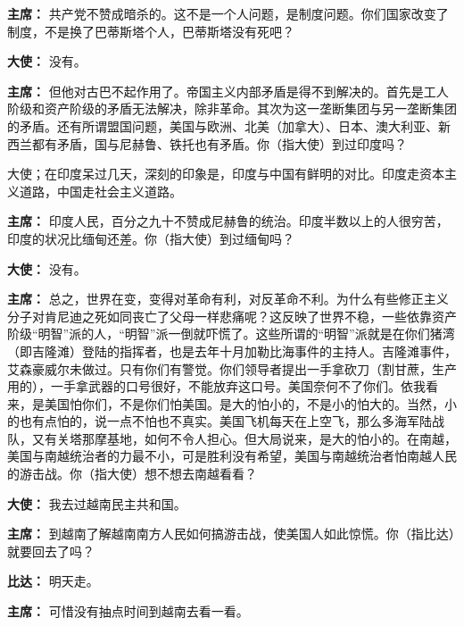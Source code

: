 \begin{duihua}
\item[\textbf{主席：}] 共产党不赞成暗杀的。这不是一个人问题，是制度问题。你们国家改变了制度，不是换了巴蒂斯塔个人，巴蒂斯塔没有死吧？

\item[\textbf{大使：}] 没有。

\item[\textbf{主席：}] 但他对古巴不起作用了。帝国主义内部矛盾是得不到解决的。首先是工人阶级和资产阶级的矛盾无法解决，除非革命。其次为这一垄断集团与另一垄断集团的矛盾。还有所谓盟国问题，美国与欧洲、北美（加拿大）、日本、澳大利亚、新西兰都有矛盾，国与尼赫鲁、铁托也有矛盾。你（指大使）到过印度吗？

大使；在印度呆过几天，深刻的印象是，印度与中国有鲜明的对比。印度走资本主义道路，中国走社会主义道路。

\item[\textbf{主席：}] 印度人民，百分之九十不赞成尼赫鲁的统治。印度半数以上的人很穷苦，印度的状况比缅甸还差。你（指大使）到过缅甸吗？

\item[\textbf{大使：}] 没有。

\item[\textbf{主席：}] 总之，世界在变，变得对革命有利，对反革命不利。为什么有些修正主义分子对肯尼迪之死如同丧亡了父母一样悲痛呢？这反映了世界不稳，一些依靠资产阶级“明智”派的人，“明智”派一倒就吓慌了。这些所谓的“明智”派就是在你们猪湾（即吉隆滩）登陆的指挥者，也是去年十月加勒比海事件的主持人。吉隆滩事件，艾森豪威尔未做过。只有你们有警觉。你们领导者提出一手拿砍刀（割甘蔗，生产用的），一手拿武器的口号很好，不能放弃这口号。美国奈何不了你们。依我看来，是美国怕你们，不是你们怕美国。是大的怕小的，不是小的怕大的。当然，小的也有点怕的，说一点不怕也不真实。美国飞机每天在上空飞，那么多海军陆战队，又有关塔那摩基地，如何不令人担心。但大局说来，是大的怕小的。在南越，美国与南越统治者的力最不小，可是胜利没有希望，美国与南越统治者怕南越人民的游击战。你（指大使）想不想去南越看看？

\item[\textbf{大使：}] 我去过越南民主共和国。

\item[\textbf{主席：}] 到越南了解越南南方人民如何搞游击战，使美国人如此惊慌。你（指比达）就要回去了吗？

\item[\textbf{比达：}] 明天走。

\item[\textbf{主席：}] 可惜没有抽点时间到越南去看一看。


\end{duihua}
